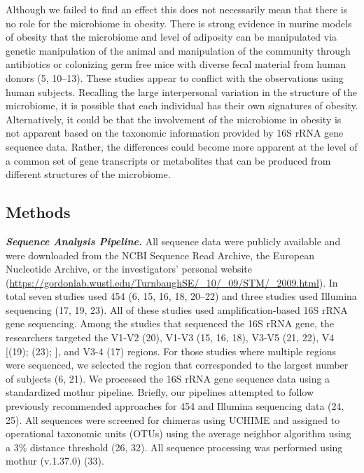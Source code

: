 \documentclass[12pt,]{article}
\begin{document}
Although we failed to find an effect this does not necessarily mean that
there is no role for the microbiome in obesity. There is strong evidence
in murine models of obesity that the microbiome and level of adiposity
can be manipulated via genetic manipulation of the animal and
manipulation of the community through antibiotics or colonizing germ
free mice with diverse fecal material from human donors (5, 10--13).
These studies appear to conflict with the observations using human
subjects. Recalling the large interpersonal variation in the structure
of the microbiome, it is possible that each individual has their own
signatures of obesity. Alternatively, it could be that the involvement
of the microbiome in obesity is not apparent based on the taxonomic
information provided by 16S rRNA gene sequence data. Rather, the
differences could become more apparent at the level of a common set of
gene transcripts or metabolites that can be produced from different
structures of the microbiome.

\subsection{Methods}\label{methods}

\textbf{\emph{Sequence Analysis Pipeline.}} All sequence data were
publicly available and were downloaded from the NCBI Sequence Read
Archive, the European Nucleotide Archive, or the investigators' personal
website
(\url{https://gordonlab.wustl.edu/TurnbaughSE/_10/_09/STM/_2009.html}).
In total seven studies used 454 (6, 15, 16, 18, 20--22) and three
studies used Illumina sequencing (17, 19, 23). All of these studies used
amplification-based 16S rRNA gene sequencing. Among the studies that
sequenced the 16S rRNA gene, the researchers targeted the V1-V2 (20),
V1-V3 (15, 16, 18), V3-V5 (21, 22), V4 {[}(19); (23); {]}, and V3-4 (17)
regions. For those studies where multiple regions were sequenced, we
selected the region that corresponded to the largest number of subjects
(6, 21). We processed the 16S rRNA gene sequence data using a
standardized mothur pipeline. Briefly, our pipelines attempted to follow
previously recommended approaches for 454 and Illumina sequencing data
(24, 25). All sequences were screened for chimeras using UCHIME and
assigned to operational taxonomic units (OTUs) using the average
neighbor algorithm using a 3\% distance threshold (26, 32). All sequence
processing was performed using mothur (v.1.37.0) (33).
\end{document}
